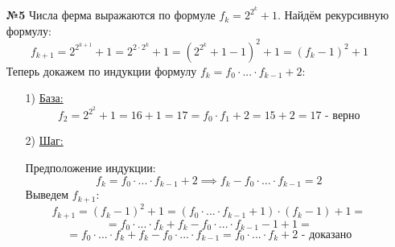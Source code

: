 \documentclass[a4paper]{article}
\begin{document}
\begin{enumerate}
    \item[\textbf{№5}]Числа ферма выражаются по формуле $f_k = 2^{2^k}+1$. Найдём рекурсивную формулу:
    $$f_{k+1} = 2^{2^{k+1}}+1 = 2^{2\cdot 2^k}+1 = (2^{2^k}+1-1)^2+1 = (f_{k}-1)^2+1$$
    Теперь докажем по индукции формулу $f_k = f_0\cdot ... \cdot f_{k-1}+2$:
    \begin{enumerate}
        \item[1)] \underline{База:}
        $$f_2 = 2^{2^2}+1 = 16+1=17 = f_0\cdot f_1 +2= 15+2=17 \text{ - верно}$$
        \item[2)] \underline{Шаг:}
        
        Предположение индукции:
        $$f_k = f_0\cdot ... \cdot f_{k-1}+2 \implies f_k-f_0\cdot ... \cdot f_{k-1} = 2$$
        Выведем $f_{k+1}$:
        $$f_{k+1} = (f_{k}-1)^2+1 = (f_0\cdot ... \cdot f_{k-1}+1)\cdot (f_k-1)+1 = $$
        $$=f_0\cdot ... \cdot f_{k}+f_k-f_0\cdot...\cdot f_{k-1}-1+1 = $$
        $$=f_0\cdot ... \cdot f_{k}+f_k-f_0\cdot...\cdot f_{k-1}= f_0\cdot ... \cdot f_{k}+2 \text{ - доказано}$$
    \end{enumerate}

    
\end{enumerate}
\end{document}
